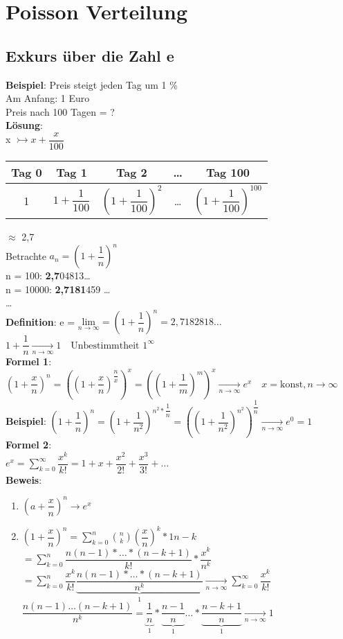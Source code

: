 \chapter{Poisson Verteilung}
\section{Exkurs über die Zahl e}
\textbf{Beispiel}: Preis steigt jeden Tag um 1 \%\\ Am Anfang: 1 Euro\\ Preis nach 100 Tagen = ?\smallskip\\
\textbf{Lösung}:\\
x $\rightarrowtail x + \dfrac{x}{100}$\smallskip\\
\begin{tabular}{c|c|c|c|c}
	Tag 0&Tag 1&Tag 2&\dots&Tag 100\\\hline
\rule{0pt}{4ex}    	1 &$1+\dfrac{1}{100}$&$\left(1+\dfrac{1}{100}\right)^2$&\dots&$\left(1+\dfrac{1}{100}\right)^{100}$
\end{tabular} $ \approx $ 2,7\medskip\\
Betrachte $a_n = (1+\dfrac{1}{n})^n$\\
n = 100: \textbf{2,7}04813\dots\\
n = 10000: \textbf{2,7181}459 \dots\\\dots\medskip\\
\textbf{Definition}: e = $\underset{n\rightarrow\infty}{\text{lim}} = (1+\dfrac{1}{n})^n = 2,7182818\dots$\medskip\\
$1 + \dfrac{1}{n}\underset{n \rightarrow \infty}{\rightarrow}1 \quad \text{Unbestimmtheit } 1^\infty$\medskip\\
\textbf{Formel 1}:\\
$(1 + \dfrac{x}{n})^n=\left(\left(1+\dfrac{x}{n}\right)^{\dfrac{n}{x}}\right)^x = \left(\left(1+\dfrac{1}{m}\right)^m\right)^x\underset{n \rightarrow\infty}{\rightarrow}e^x\quad x = \text{konst}, n \rightarrow \infty$\medskip\\
\textbf{Beispiel}: $(1+\dfrac{1}{n})^n = (1+\dfrac{1}{n^2})^{n^2*\dfrac{1}{n}}= ((1+\dfrac{1}{n^2})^{n^2})^{\dfrac{1}{n}} \underset{n\rightarrow\infty}{\rightarrow} e^0 = 1$\medskip\\
\textbf{Formel 2}:\\
$e^x = \sum_{k=0}^{\infty}\dfrac{x^k}{k!}=1+x+\dfrac{x^2}{2!}+\dfrac{x^3}{3!}+\dots$\smallskip\\
\textbf{Beweis}:
\begin{enumerate}
	\item $(a+\dfrac{x}{n})^n \rightarrow e^x$
	\item $(1+\dfrac{x}{n})^n = \sum_{k=0}^n \binom{n}{k}(\dfrac{x}{n})^k*1 {n-k}$\smallskip\\$=\sum_{k=0}^n \dfrac{n(n-1)*\dots*(n-k+1)}{k!}*\dfrac{x^k}{n^k}$\smallskip\\
	$= \sum_{k=0}^n \dfrac{x^k}{k!}\underbrace{\dfrac{n(n-1)*\dots*(n-k+1)}{n^k}}_{1} \underset{n \rightarrow \infty}{\rightarrow}\sum_{k=0}^\infty\dfrac{x^k}{k!}$\medskip\\
	$\dfrac{n(n-1)\dots(n-k+1)}{n^k}=\underbrace{\dfrac{1}{n}}_1*\underbrace{\dfrac{n-1}{n}}_1 \dots *\underbrace{\dfrac{n-k+1}{n}}_1 \underset{n\rightarrow\infty}{\rightarrow}1$
\end{enumerate}
